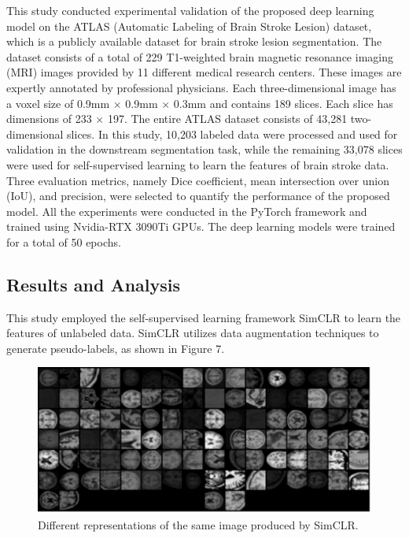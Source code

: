 \documentclass[10pt,twocolumn,a4paper]{article}
\begin{document}
This study conducted experimental validation of the proposed deep learning model on the ATLAS (Automatic Labeling of Brain Stroke Lesion) dataset\cite{ATLAS}, which is a publicly available dataset for brain stroke lesion segmentation. The dataset consists of a total of 229 T1-weighted brain magnetic resonance imaging (MRI) images provided by 11 different medical research centers. These images are expertly annotated by professional physicians. Each three-dimensional image has a voxel size of 0.9mm $\times$ 0.9mm $\times$ 0.3mm and contains 189 slices. Each slice has dimensions of 233 $\times$ 197. The entire ATLAS dataset consists of 43,281 two-dimensional slices. In this study, 10,203 labeled data were processed and used for validation in the downstream segmentation task, while the remaining 33,078 slices were used for self-supervised learning to learn the features of brain stroke data.
Three evaluation metrics, namely Dice coefficient, mean intersection over union (IoU), and precision, were selected to quantify the performance of the proposed model.
All the experiments were conducted in the PyTorch framework and trained using Nvidia-RTX 3090Ti GPUs. The deep learning models were trained for a total of 50 epochs.

\subsection{Results and Analysis}

This study employed the self-supervised learning framework SimCLR to learn the features of unlabeled data. SimCLR utilizes data augmentation techniques to generate pseudo-labels, as shown in Figure 7.

\begin{figure}[htbp]   %
	\centering
	\includegraphics[width=\linewidth,scale=1.00]{Images/DR_SimCLR.png}
	\caption{Different representations of the same image produced by SimCLR.}
  \label{fig:dr_simclr}
\end{figure}
\end{document}
